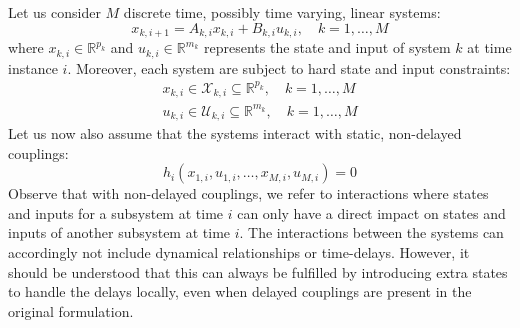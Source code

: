 Let us consider $M$ discrete time, possibly time varying, linear systems:
\begin{equation} \label{e:SystemDynamics}
x_{k,i+1} = A_{k,i} x_{k,i} + B_{k,i} u_{k,i}, \quad k = 1, \dots, M
\end{equation}
where $x_{k,i} \in \mathbb{R}^{p_{k}}$ and $u_{k,i} \in \mathbb{R}^{m_{k}}$ represents the state and input of system $k$ at time instance $i$. Moreover, each system are subject to hard state and input constraints:
\begin{subequations} \label{e:StateInputConstraints}
\begin{align}
x_{k,i} \in \mathcal{X}_{k,i} \subseteq \mathbb{R}^{p_{k}}, \quad k = 1, \dots, M \\
u_{k,i} \in \mathcal{U}_{k,i} \subseteq \mathbb{R}^{m_{k}}, \quad k = 1, \dots, M
\end{align}
\end{subequations}
Let us now also assume that the systems interact with static, non-delayed couplings:
\begin{equation} \label{e:MPCcouplings}
h_i(x_{1,i}, u_{1,i}, \dots, x_{M,i}, u_{M,i}) = 0
\end{equation}
Observe that with non-delayed couplings, we refer to interactions where states and inputs for a subsystem at time $i$ can only have a direct impact on states and inputs of another subsystem at time $i$. The interactions between the systems can accordingly not include dynamical relationships or time-delays. However, it should be understood that this can always be fulfilled by introducing extra states to handle the delays locally, even when delayed couplings are present in the original formulation.

